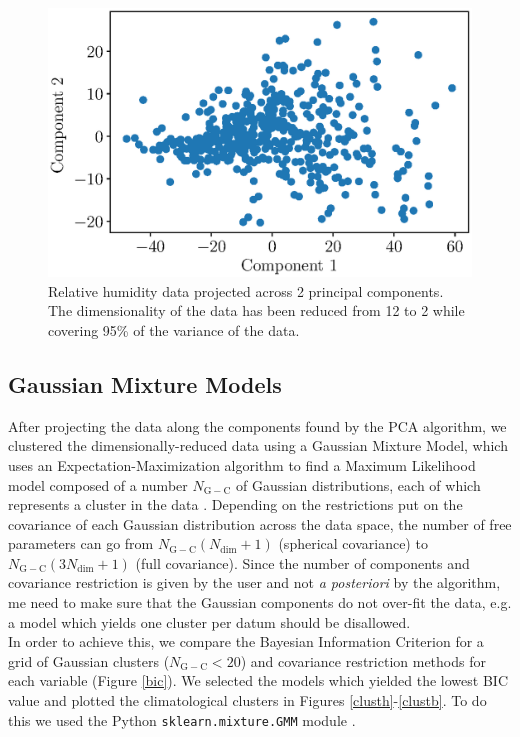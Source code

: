 \documentclass[12pt]{iopart}
\begin{document}
\begin{figure}
\begin{center}
\includegraphics[scale=0.8]{pcah.eps}
\caption{Relative humidity data projected across 2 principal components. The dimensionality of the data has been reduced from 12 to 2 while covering 95\% of the variance of the data. }\label{pcah}
\end{center}
\end{figure}

\subsection{Gaussian Mixture Models}

After projecting the data along the components found by the PCA algorithm, we clustered the dimensionally-reduced data using a Gaussian Mixture Model, which uses an Expectation-Maximization algorithm to find a Maximum Likelihood model composed of a number $N_\mathrm{G-C}$ of Gaussian distributions, each of which represents a cluster in the data \cite{gmm}. Depending on the restrictions put on the covariance of each Gaussian distribution across the data space, the number of free parameters can go from $N_\mathrm{G-C}(N_\mathrm{dim}+1)$ (spherical covariance) to  $N_\mathrm{G-C}(3N_\mathrm{dim}+1)$ (full covariance). Since the number of components and covariance restriction is given by the user and not \emph{a posteriori} by the algorithm, me need to make sure that the Gaussian components do not over-fit the data, e.g. a model which yields one cluster per datum should be disallowed.\\

In order to achieve this, we compare the Bayesian Information Criterion \cite{bicref} for a grid of Gaussian clusters ($N_\mathrm{G-C}<20$) and covariance restriction methods for each variable (Figure \ref{bic}). We selected the models which yielded the lowest BIC value and plotted the climatological clusters in Figures \ref{clusth}-\ref{clustb}. To do this we used the Python \texttt{sklearn.mixture.GMM} module \cite{sklearn}.\\
\end{document}
